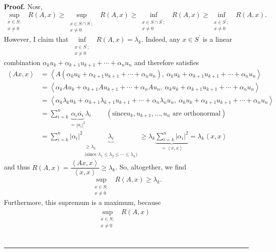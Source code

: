 \documentclass[numbers=enddot,12pt,final,onecolumn,notitlepage]{scrartcl}%
\numberwithin{exer}{subsection}
\theoremstyle{definition}
\newenvironment{proof}[1][Proof]{\noindent\textbf{#1.} }{\ \rule{0.5em}{0.5em}}
\let\sumnonlimits\sum
\renewcommand{\sum}{\sumnonlimits\limits}
\begin{document}
\begin{proof}
Now,%
\[
\sup\limits_{\substack{x\in S;\\x\neq0}}\ \ R\left(  A,x\right)  \geq
\sup\limits_{\substack{x\in S\cap S^{\prime};\\x\neq0}}\ \ R\left(
A,x\right)  \geq\inf\limits_{\substack{x\in S\cap S^{\prime};\\x\neq
0}}\ \ R\left(  A,x\right)  \geq\inf\limits_{\substack{x\in S^{\prime}%
;\\x\neq0}}\ \ R\left(  A,x\right)  .
\]
However, I claim that $\inf\limits_{\substack{x\in S^{\prime};\\x\neq
0}}\ \ R\left(  A,x\right)  =\lambda_{k}$. Indeed, any $x\in S^{\prime}$ is a
linear combination $\alpha_{k}u_{k}+\alpha_{k+1}u_{k+1}+\cdots+\alpha_{n}%
u_{n}$ and therefore satisfies%
\begin{align*}
\left\langle Ax,x\right\rangle  &  =\left\langle A\left(  \alpha_{k}%
u_{k}+\alpha_{k+1}u_{k+1}+\cdots+\alpha_{n}u_{n}\right)  ,\ \alpha_{k}%
u_{k}+\alpha_{k+1}u_{k+1}+\cdots+\alpha_{n}u_{n}\right\rangle \\
&  =\left\langle \alpha_{k}Au_{k}+\alpha_{k+1}Au_{k+1}+\cdots+\alpha_{n}%
Au_{n},\ \alpha_{k}u_{k}+\alpha_{k+1}u_{k+1}+\cdots+\alpha_{n}u_{n}%
\right\rangle \\
&  =\left\langle \alpha_{k}\lambda_{k}u_{k}+\alpha_{k+1}\lambda_{k+1}%
u_{k+1}+\cdots+\alpha_{n}\lambda_{n}u_{n},\ \alpha_{k}u_{k}+\alpha
_{k+1}u_{k+1}+\cdots+\alpha_{n}u_{n}\right\rangle \\
&  =\sum_{i=k}^{n}\underbrace{\alpha_{i}\overline{\alpha_{i}}}_{=\left\vert
\alpha_{i}\right\vert ^{2}}\lambda_{i}\ \ \ \ \ \ \ \ \ \ \left(  \text{since
}u_{k},u_{k+1},\ldots,u_{n}\text{ are orthonormal}\right) \\
&  =\sum_{i=k}^{n}\left\vert \alpha_{i}\right\vert ^{2}\underbrace{\lambda
_{i}}_{\substack{\geq\lambda_{k}\\\text{(since }\lambda_{1}\leq\lambda_{2}%
\leq\cdots\leq\lambda_{n}\text{)}}}\geq\lambda_{k}\underbrace{\sum_{i=k}%
^{n}\left\vert \alpha_{i}\right\vert ^{2}}_{=\left\langle x,x\right\rangle
}=\lambda_{k}\left\langle x,x\right\rangle
\end{align*}
and thus $R\left(  A,x\right)  =\dfrac{\left\langle Ax,x\right\rangle
}{\left\langle x,x\right\rangle }\geq\lambda_{k}$. So, altogether, we find%
\[
\sup\limits_{\substack{x\in S;\\x\neq0}}\ \ R\left(  A,x\right)  \geq
\lambda_{k}.
\]
Furthermore, this supremum is a maximum, because
\begin{align*}
\sup\limits_{\substack{x\in S;\\x\neq0}}\ \ R\left(  A,x\right)   &

\end{align*}
\end{proof}
\end{document}
